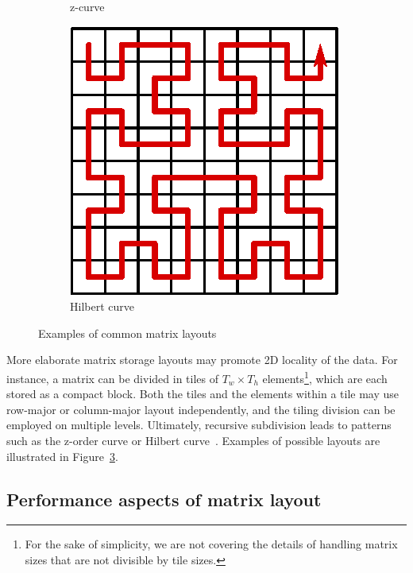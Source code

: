 \begin{figure}
\begin{subfigure}{.19\textwidth}
    \caption{z-curve}
    \label{fig:layout-zcurve}
\end{subfigure}
\begin{subfigure}{.19\textwidth}
    \centering
    \includegraphics[width=.9\linewidth]{figures/matrix-hcurve}
    \caption{Hilbert curve}
    \label{fig:layout-hcurve}
\end{subfigure}

\caption{Examples of common matrix layouts}
\label{fig:layout}
\end{figure}

More elaborate matrix storage layouts may promote 2D locality of the data. For instance, a matrix can be divided in tiles of $T_w \times T_h$ elements\footnote{For the sake of simplicity, we are not covering the details of handling matrix sizes that are not divisible by tile sizes.}, which are each stored as a compact block. Both the tiles and the elements within a tile may use row-major or column-major layout independently, and the tiling division can be employed on multiple levels. Ultimately, recursive subdivision leads to patterns such as the z-order curve or Hilbert curve~\cite{dai2003locality}. Examples of possible layouts are illustrated in Figure~\ref{fig:layout}.


\subsection{Performance aspects of matrix layout}\label{sec:motivation-perf}

